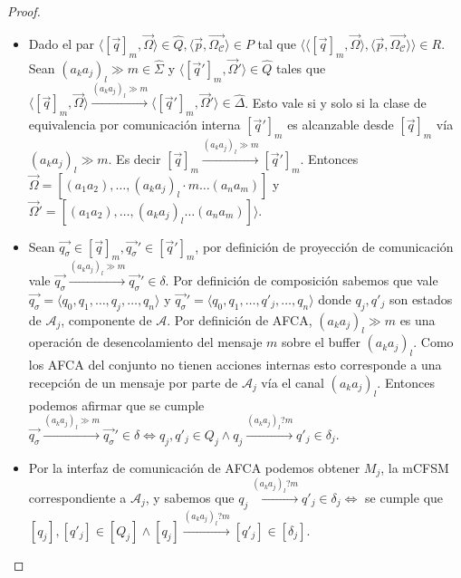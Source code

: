 \begin{proof}
\begin{itemize}
    \item Dado el par $\langle [\overrightarrow{q}]_m, \overrightarrow{\Omega} \rangle \in \widehat{Q}, \langle \overrightarrow{p}, \overrightarrow{\Omega_\mathcal{C}} \rangle \in P$ tal que $\langle \langle [\overrightarrow{q}]_m, \overrightarrow{\Omega} \rangle, \langle \overrightarrow{p}, \overrightarrow{\Omega_\mathcal{C}} \rangle \rangle \in R$. Sean $(a_ka_j)_l \gg m \in \widehat{\Sigma}$ y $\langle [\overrightarrow{q}']_m, \overrightarrow{\Omega}' \rangle \in \widehat{Q}$ tales que $\langle [\overrightarrow{q}]_m, \overrightarrow{\Omega} \rangle \xrightarrow{(a_ka_j)_l \gg m} \langle [\overrightarrow{q}']_m, \overrightarrow{\Omega}' \rangle \in \widehat{\Delta}$.  Esto vale si y solo si la clase de equivalencia por comunicación interna $[\overrightarrow{q}']_m$ es alcanzable desde $[\overrightarrow{q}]_m$ vía $(a_ka_j)_l \gg m$. Es decir $[\overrightarrow{q}]_m \xrightarrow{(a_ka_j)_l \gg m} [\overrightarrow{q}']_m$. Entonces $\overrightarrow{\Omega} = [(a_1a_2), \ldots, (a_ka_j)_l \cdot m \ldots (a_na_m)]$ y $\overrightarrow{\Omega}' = [(a_1a_2), \ldots, (a_ka_j)_l \ldots (a_na_m)] \rangle$.
    
    \item Sean $\overrightarrow{q_{\sigma}} \in [\overrightarrow{q}]_m, \overrightarrow{q_{\sigma}}' \in [\overrightarrow{q}']_m$, por definición de proyección de comunicación vale $\overrightarrow{q_{\sigma}} \xrightarrow{(a_ka_j)_l \gg m} \overrightarrow{q_{\sigma}}' \in \delta$. Por definición de composición sabemos que vale $\overrightarrow{q_{\sigma}} =\langle q_0, q_1, \ldots, q_j, \ldots,q_n \rangle$ y $\overrightarrow{q_{\sigma}}' =\langle q_0, q_1, \ldots, q'_j, \ldots,q_n \rangle$ donde $q_j,q'_j$ son estados de $\mathcal{A}_j$, componente de $\mathcal{A}$. Por definición de AFCA, $(a_ka_j)_l \gg m$ es una operación de desencolamiento del mensaje $m$ sobre el buffer $(a_ka_j)_l$. Como los AFCA del conjunto no tienen acciones internas esto corresponde a una recepción de un mensaje por parte de $\mathcal{A}_j$ vía el canal $(a_ka_j)_l$. Entonces podemos afirmar que se cumple $\overrightarrow{q_{\sigma}} \xrightarrow{(a_ka_j)_l \gg m} \overrightarrow{q_{\sigma}}'\in \delta \iff q_j,q'_j \in Q_j \land q_j \xrightarrow{(a_ka_j)_l?m} q'_j \in \delta_j$.
    
    \item Por la interfaz de comunicación de AFCA podemos obtener $M_j$, la mCFSM correspondiente a $\mathcal{A}_j$, y sabemos que $q_j \xrightarrow{(a_ka_j)_l?m} q'_j \in \delta_j \iff$ se cumple que $[q_j], [q'_j] \in [Q_j] \land [q_j] \xrightarrow{(a_ka_j)_l?m} [q'_j] \in [\delta_j]$. 
    

\end{itemize}
\end{proof}
